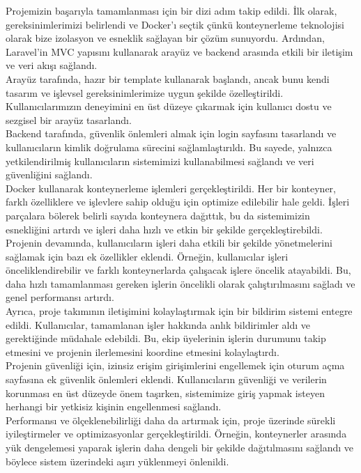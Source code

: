 Projemizin başarıyla tamamlanması için bir dizi adım takip edildi. İlk olarak, gereksinimlerimizi belirlendi ve Docker'ı seçtik çünkü konteynerleme teknolojisi olarak bize izolasyon ve esneklik sağlayan bir çözüm sunuyordu. Ardından, Laravel'in MVC yapısını kullanarak arayüz ve backend arasında etkili bir iletişim ve veri akışı sağlandı.\\
Arayüz tarafında, hazır bir template kullanarak başlandı, ancak bunu kendi tasarım ve işlevsel gereksinimlerimize uygun şekilde özelleştirildi. Kullanıcılarımızın deneyimini en üst düzeye çıkarmak için kullanıcı dostu ve sezgisel bir arayüz tasarlandı.\\
Backend tarafında, güvenlik önlemleri almak için login sayfasını tasarlandı ve kullanıcıların kimlik doğrulama sürecini sağlamlaştırıldı. Bu sayede, yalnızca yetkilendirilmiş kullanıcıların sistemimizi kullanabilmesi sağlandı ve veri güvenliğini sağlandı.\\
Docker kullanarak konteynerleme işlemleri gerçekleştirildi. Her bir konteyner, farklı özelliklere ve işlevlere sahip olduğu için optimize edilebilir hale geldi. İşleri parçalara bölerek belirli sayıda konteynera dağıttık, bu da sistemimizin esnekliğini artırdı ve işleri daha hızlı ve etkin bir şekilde gerçekleştirebildi.\\
Projenin devamında, kullanıcıların işleri daha etkili bir şekilde yönetmelerini sağlamak için bazı ek özellikler eklendi. Örneğin, kullanıcılar işleri önceliklendirebilir ve farklı konteynerlarda çalışacak işlere öncelik atayabildi. Bu, daha hızlı tamamlanması gereken işlerin öncelikli olarak çalıştırılmasını sağladı ve genel performansı artırdı.\\
Ayrıca, proje takımının iletişimini kolaylaştırmak için bir bildirim sistemi entegre edildi. Kullanıcılar, tamamlanan işler hakkında anlık bildirimler aldı ve gerektiğinde müdahale edebildi. Bu, ekip üyelerinin işlerin durumunu takip etmesini ve projenin ilerlemesini koordine etmesini kolaylaştırdı.\\
Projenin güvenliği için, izinsiz erişim girişimlerini engellemek için oturum açma sayfasına ek güvenlik önlemleri eklendi. Kullanıcıların güvenliği ve verilerin korunması en üst düzeyde önem taşırken, sistemimize giriş yapmak isteyen herhangi bir yetkisiz kişinin engellenmesi sağlandı.\\
Performansı ve ölçeklenebilirliği daha da artırmak için, proje üzerinde sürekli iyileştirmeler ve optimizasyonlar gerçekleştirildi. Örneğin, konteynerler arasında yük dengelemesi yaparak işlerin daha dengeli bir şekilde dağıtılmasını sağlandı ve böylece sistem üzerindeki aşırı yüklenmeyi önlenildi.\\
